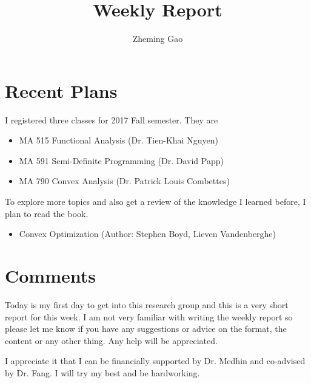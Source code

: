 \documentclass[12pt]{article}
\begin{document}
 
 
\title{Weekly Report}
\author{Zheming Gao}
\maketitle


\section*{Recent Plans}

I registered three classes for 2017 Fall semester. They are
\begin{itemize}
\item
MA 515 Functional Analysis    \quad   (Dr. Tien-Khai Nguyen)
\item
MA 591 Semi-Definite Programming \quad (Dr. David Papp)
\item
MA 790 Convex Analysis \quad  (Dr. Patrick Louis Combettes)
\end{itemize}

To explore more topics and also get a review of the knowledge I learned before, I plan to read  the book.

\begin{itemize}
\item
Convex Optimization (Author: Stephen Boyd, Lieven Vandenberghe)
\end{itemize}

\section*{Comments}


Today is my first day to get into this research group and this is a very short report for this week. I am not very familiar with writing the weekly report so please let me know if you have any suggestions or advice on the format, the content or any other thing. Any help will be appreciated.

I appreciate it that I can be financially supported by Dr. Medhin and co-advised by Dr. Fang. I will try my best and be hardworking. 
\end{document}
